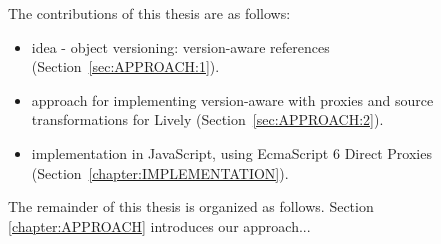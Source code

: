 The contributions of this thesis are as follows:
\begin{itemize}
    \item idea - object versioning: version-aware references (Section~\ref{sec:APPROACH:1}).
    \item approach for implementing version-aware with proxies and source transformations for Lively (Section~\ref{sec:APPROACH:2}).
    \item implementation in JavaScript, using EcmaScript 6 Direct Proxies (Section~\ref{chapter:IMPLEMENTATION}).\\
\end{itemize}

The remainder of this thesis is organized as follows. Section \ref{chapter:APPROACH} introduces our approach...\\
